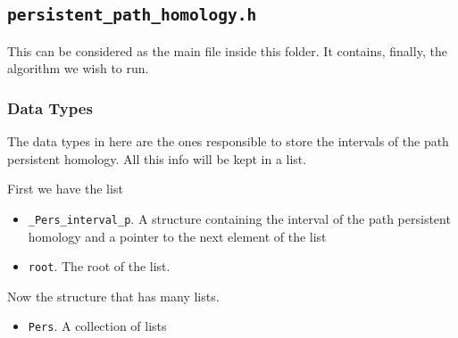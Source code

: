 \documentclass[11pt,a4paper]{article}
\begin{document}


\subsection{\texttt{persistent\_path\_homology.h}}
This can be considered as the main file inside this folder. It contains, finally,
the algorithm we wish to run.

\subsubsection{Data Types}
The data types in here are the ones responsible to store the intervals of the path persistent homology.
All this info will be kept in a list.

First we have the list
\begin{itemize}
	\item \texttt{\_Pers\_interval\_p}. A structure containing the interval of
		the path persistent homology and a pointer to the next element of 
		the list

	\item \texttt{root}. The root of the list.
\end{itemize}
Now the structure that has many lists.
\begin{itemize}
	\item \texttt{Pers}. A collection of lists
\end{itemize}

\end{document}
